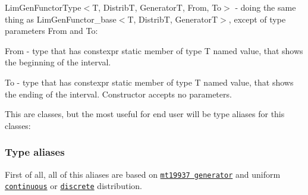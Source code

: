 \begin{DoxyItemize}
\begin{DoxyItemize}
\end{DoxyItemize}
\item {\ttfamily Lim\+Gen\+Functor\+Type$<$T, DistribT, GeneratorT, From, To$>$} -\/ doing the same thing as {\ttfamily Lim\+Gen\+Functor\+\_\+base$<$T, DistribT, GeneratorT$>$}, except of type parameters {\ttfamily From} and {\ttfamily To}\+:
\begin{DoxyItemize}
\item {\ttfamily From} -\/ type that has {\ttfamily constexpr static} member of type {\ttfamily T} named {\ttfamily value}, that shows the beginning of the interval.
\item {\ttfamily To} -\/ type that has {\ttfamily constexpr static} member of type {\ttfamily T} named {\ttfamily value}, that shows the ending of the interval. Constructor accepts no parameters.
\end{DoxyItemize}
\end{DoxyItemize}

This are classes, but the most useful for end user will be type aliases for this classes\+: \subsubsection*{Type aliases}

First of all, all of this aliases are based on \href{https://en.wikipedia.org/wiki/Mersenne_Twister}{\tt mt19937 generator} and uniform \href{https://en.wikipedia.org/wiki/Uniform_distribution_(continuous)}{\tt continuous} or \href{https://en.wikipedia.org/wiki/Discrete_uniform_distribution}{\tt discrete} distribution.


